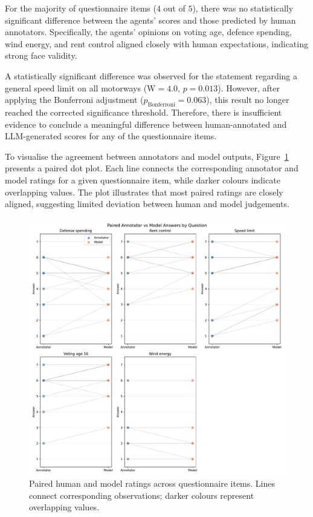 For the majority of questionnaire items ($4$ out of $5$), there was no statistically significant difference between the agents’ scores and those predicted by human annotators. Specifically, the agents’ opinions on voting age, defence spending, wind energy, and rent control aligned closely with human expectations, indicating strong face validity.

A statistically significant difference was observed for the statement regarding a general speed limit on all motorways ($\text{W} = 4.0$, $p = 0.013$). However, after applying the Bonferroni adjustment ($p_{\text{Bonferroni}} = 0.063$), this result no longer reached the corrected significance threshold. Therefore, there is insufficient evidence to conclude a meaningful difference between human-annotated and LLM-generated scores for any of the questionnaire items.

To visualise the agreement between annotators and model outputs, Figure~\ref{fig:sanity_check} presents a paired dot plot. Each line connects the corresponding annotator and model ratings for a given questionnaire item, while darker colours indicate overlapping values. The plot illustrates that most paired ratings are closely aligned, suggesting limited deviation between human and model judgements.

\begin{figure}[!htbp]
\centering
\includegraphics[width=\linewidth]{imgs/sanity_check_paired_plot.pdf}
\caption{Paired human and model ratings across questionnaire items. Lines connect corresponding observations; darker colours represent overlapping values.}
\label{fig:sanity_check}
\end{figure}


